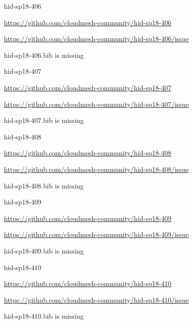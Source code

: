 \begin{IU}

hid-sp18-406

\url{https://github.com/cloudmesh-community/hid-sp18-406}

\url{https://github.com/cloudmesh-community/hid-sp18-406/issue}

hid-sp18-406.bib is missing

\end{IU}


\begin{IU}

hid-sp18-407

\url{https://github.com/cloudmesh-community/hid-sp18-407}

\url{https://github.com/cloudmesh-community/hid-sp18-407/issue}

hid-sp18-407.bib is missing

\end{IU}


\begin{IU}

hid-sp18-408

\url{https://github.com/cloudmesh-community/hid-sp18-408}

\url{https://github.com/cloudmesh-community/hid-sp18-408/issue}

hid-sp18-408.bib is missing

\end{IU}


\begin{IU}

hid-sp18-409

\url{https://github.com/cloudmesh-community/hid-sp18-409}

\url{https://github.com/cloudmesh-community/hid-sp18-409/issue}

hid-sp18-409.bib is missing

\end{IU}


\begin{IU}

hid-sp18-410

\url{https://github.com/cloudmesh-community/hid-sp18-410}

\url{https://github.com/cloudmesh-community/hid-sp18-410/issue}

hid-sp18-410.bib is missing

\end{IU}


